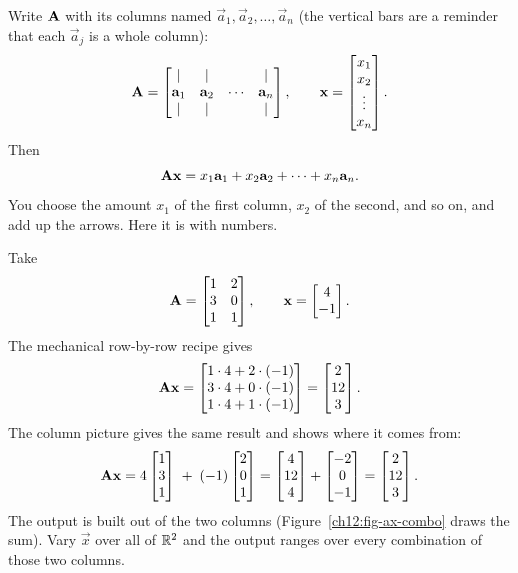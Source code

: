 Write $\mathbf{A}$ with its columns named $\vec{a}_1, \vec{a}_2, \dots, \vec{a}_n$
(the vertical bars are a reminder that each $\vec{a}_j$ is a whole column):
\[
  \mathbf{A} = \begin{bmatrix} \vert & \vert & & \vert \\
  \mathbf{a}_1 & \mathbf{a}_2 & \cdots & \mathbf{a}_n \\
  \vert & \vert & & \vert \end{bmatrix},
  \qquad
  \mathbf{x} = \begin{bmatrix}x_1 \\ x_2 \\ \vdots \\ x_n\end{bmatrix}.
\]
Then
\[
  \mathbf{A}\mathbf{x} = x_1 \mathbf{a}_1 + x_2 \mathbf{a}_2 + \cdots + x_n \mathbf{a}_n.
\]
You choose the amount $x_1$ of the first column, $x_2$ of the second, and so on,
and add up the arrows. Here it is with numbers.

\begin{example}\label{ch12:ax-as-combo}
Take
\[
  \mathbf{A} = \begin{bmatrix} 1 & 2 \\ 3 & 0 \\ 1 & 1 \end{bmatrix},
  \qquad \mathbf{x} = \begin{bmatrix}4 \\ -1\end{bmatrix}.
\]
The mechanical row-by-row recipe gives
\[
  \mathbf{A}\mathbf{x} = \begin{bmatrix}1\cdot 4 + 2\cdot(-1) \\ 3\cdot 4 + 0\cdot(-1)
  \\ 1\cdot 4 + 1\cdot(-1)\end{bmatrix} = \begin{bmatrix}2 \\ 12 \\ 3\end{bmatrix}.
\]
The column picture gives the same result and shows where it comes from:
\[
  \mathbf{A}\mathbf{x} = 4\begin{bmatrix}1 \\ 3 \\ 1\end{bmatrix} \;+\; (-1)\begin{bmatrix}2 \\ 0 \\ 1\end{bmatrix}
  = \begin{bmatrix}4 \\ 12 \\ 4\end{bmatrix} + \begin{bmatrix}-2 \\ 0 \\ -1\end{bmatrix} = \begin{bmatrix}2 \\ 12 \\ 3\end{bmatrix}.
\]
The output is built out of the two
columns (Figure~\ref{ch12:fig-ax-combo} draws the sum). Vary $\vec{x}$ over all of $\mathbb{R}^2$ and the output ranges over every
combination of those two columns.
\end{example}

